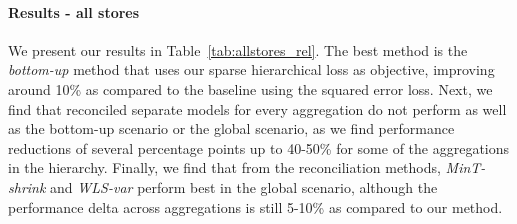 \documentclass[preprint, 3p, times, twocolumn]{elsarticle}
\begin{document}
    

  \paragraph{Results - all stores} We present our results in Table~\ref{tab:allstores_rel}. The best method is the \textit{bottom-up} method that uses our sparse hierarchical loss as objective, improving around 10\% as compared to the baseline using the squared error loss. Next, we find that reconciled separate models for every aggregation do not perform as well as the bottom-up scenario or the global scenario, as we find performance reductions of several percentage points up to 40-50\% for some of the aggregations in the hierarchy. Finally, we find that from the reconciliation methods, \textit{MinT-shrink} and \textit{WLS-var} perform best in the global scenario, although the performance delta across aggregations is still 5-10\% as compared to our method.
\end{document}
